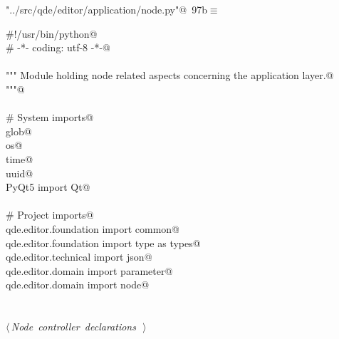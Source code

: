 \documentclass[
    a4paper,      %
    10pt,         %
    openright,    %
    notitlepage,  %
    parskip=half, %
]{scrreprt}       %
\theoremstyle{definition}                    %
\begin{document}
\begin{flushleft} \small
\begin{minipage}{\linewidth}\label{scrap160}\raggedright\small
{} \verb@"../src/qde/editor/application/node.py"@\nobreak\ {\footnotesize {97b}}$\equiv$
\vspace{-1ex}
\begin{list}{}{} \item
\mbox{}\lstinline@#!/usr/bin/python@\\
\mbox{}\lstinline@# -*- coding: utf-8 -*-@\\
\mbox{}\lstinline@@\\
\mbox{}\lstinline@""" Module holding node related aspects concerning the application layer.@\\
\mbox{}\lstinline@"""@\\
\mbox{}\lstinline@@\\
\mbox{}\lstinline@# System imports@\\
\mbox{}\lstinline@import glob@\\
\mbox{}\lstinline@import os@\\
\mbox{}\lstinline@import time@\\
\mbox{}\lstinline@import uuid@\\
\mbox{}\lstinline@from PyQt5 import Qt@\\
\mbox{}\lstinline@@\\
\mbox{}\lstinline@# Project imports@\\
\mbox{}\lstinline@from qde.editor.foundation import common@\\
\mbox{}\lstinline@from qde.editor.foundation import type as types@\\
\mbox{}\lstinline@from qde.editor.technical import json@\\
\mbox{}\lstinline@from qde.editor.domain import parameter@\\
\mbox{}\lstinline@from qde.editor.domain import node@\\
\mbox{}\lstinline@@\\
\mbox{}\lstinline@@\\
\mbox{}\lstinline@@\hbox{$\langle\,${\itshape Node controller declarations}\nobreak\ {\footnotesize {}}$\,\rangle$}\lstinline@@\\
\mbox{}\lstinline@@{\NWsep}
\end{list}
\vspace{-1.5ex}
\footnotesize
\begin{list}{}{\setlength{\itemsep}{-\parsep}\setlength{\itemindent}{-\leftmargin}}

\item{}
\end{list}
\end{minipage}\vspace{4ex}
\end{flushleft}
\end{document}
